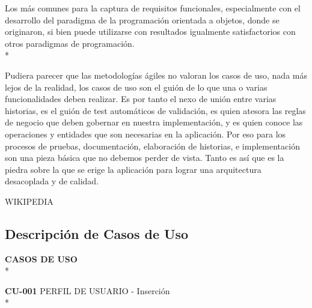 \documentclass[../pfc.tex]{subfiles}
\begin{document}
	Los más comunes para la captura de requisitos funcionales, especialmente con el desarrollo del paradigma de la programación orientada a objetos, donde se originaron, si bien puede utilizarse con resultados igualmente satisfactorios con otros paradigmas de programación.\\*
	
	Pudiera parecer que las metodologías ágiles no valoran los casos de uso, nada más lejos de la realidad, los casos de uso son el guión de lo que una o varias funcionalidades deben realizar. Es por tanto el nexo de unión entre varias historias, es el guión de test automáticos de validación, es quien atesora las reglas de negocio que deben gobernar en nuestra implementación, y es quien conoce las operaciones y entidades que son necesarias en la aplicación. Por eso para los procesos de pruebas, documentación, elaboración de historias, e implementación son una pieza básica que no debemos perder de vista. Tanto es así que es la piedra sobre la que se erige la aplicación para lograr una arquitectura desacoplada y de calidad. 
	
	WIKIPEDIA
	
	\clearpage

	\subsection{Descripción de Casos de Uso}
	
	\textbf{CASOS DE USO}\\*
	
	\textbf{CU-001} PERFIL DE USUARIO - Inserción\\*
	
\end{document}

